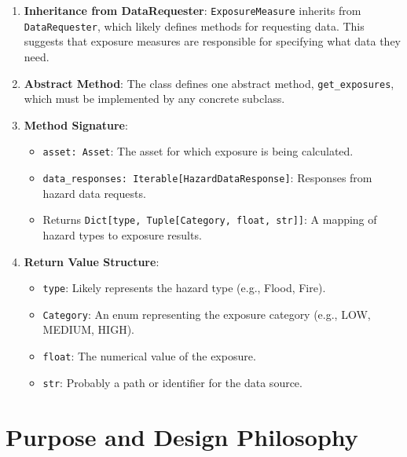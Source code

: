 \documentclass{article}
\begin{document}
\begin{enumerate}
    \item \textbf{Inheritance from DataRequester}: 
    \texttt{ExposureMeasure} inherits from \texttt{DataRequester}, which likely defines methods for requesting data. This suggests that exposure measures are responsible for specifying what data they need.

    \item \textbf{Abstract Method}:
    The class defines one abstract method, \texttt{get\_exposures}, which must be implemented by any concrete subclass.

    \item \textbf{Method Signature}:
    \begin{itemize}
        \item \texttt{asset: Asset}: The asset for which exposure is being calculated.
        \item \texttt{data\_responses: Iterable[HazardDataResponse]}: Responses from hazard data requests.
        \item Returns \texttt{Dict[type, Tuple[Category, float, str]]}: A mapping of hazard types to exposure results.
    \end{itemize}

    \item \textbf{Return Value Structure}:
    \begin{itemize}
        \item \texttt{type}: Likely represents the hazard type (e.g., Flood, Fire).
        \item \texttt{Category}: An enum representing the exposure category (e.g., LOW, MEDIUM, HIGH).
        \item \texttt{float}: The numerical value of the exposure.
        \item \texttt{str}: Probably a path or identifier for the data source.
    \end{itemize}
\end{enumerate}

\section{Purpose and Design Philosophy}
\end{document}
